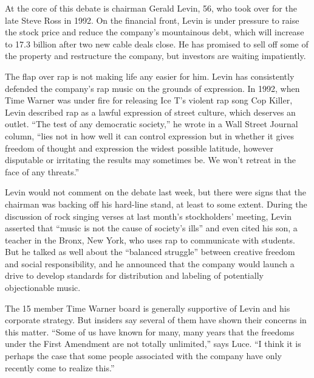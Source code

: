 At the core of this debate is chairman Gerald Levin, 56, who took over for the late Steve Ross in 1992. On the financial front, Levin is under pressure to raise the stock price and reduce the company’s mountainous debt, which will increase to 17.3 billion after two new cable deals close. He has promised to sell off some of the property and restructure the company, but investors are waiting impatiently.

The flap over rap is not making life any easier for him. Levin has consistently defended the company’s rap music on the grounds of expression. In 1992, when Time Warner was under fire for releasing Ice T’s violent rap song Cop Killer, Levin described rap as a lawful expression of street culture, which deserves an outlet. “The test of any democratic society,” he wrote in a Wall Street Journal column, “lies not in how well it can control expression but in whether it gives freedom of thought and expression the widest possible latitude, however disputable or irritating the results may sometimes be. We won’t retreat in the face of any threats.”

Levin would not comment on the debate last week, but there were signs that the chairman was backing off his hard-line stand, at least to some extent. During the discussion of rock singing verses at last month’s stockholders’ meeting, Levin asserted that “music is not the cause of society’s ills” and even cited his son, a teacher in the Bronx, New York, who uses rap to communicate with students. But he talked as well about the “balanced struggle” between creative freedom and social responsibility, and he announced that the company would launch a drive to develop standards for distribution and labeling of potentially objectionable music.

The 15 member Time Warner board is generally supportive of Levin and his corporate strategy. But insiders say several of them have shown their concerns in this matter. “Some of us have known for many, many years that the freedoms under the First Amendment are not totally unlimited,” says Luce. “I think it is perhaps the case that some people associated with the company have only recently come to realize this.”

